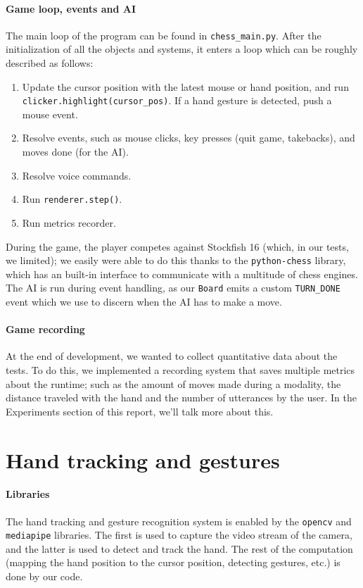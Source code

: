 \documentclass[a4paper, 11pt, twocolumn]{IEEEtran}
\begin{document}
    \paragraph*{Game loop, events and AI} The main loop of the program can be found in \texttt{chess\_main.py}. After the initialization of all the objects and systems, it enters a loop which can be roughly described as follows:
    \begin{enumerate}
        \item Update the cursor position with the latest mouse or hand position, and run \texttt{clicker.highlight(cursor\_pos)}. If a hand gesture is detected, push a mouse event.
        \item Resolve events, such as mouse clicks, key presses (quit game, takebacks), and moves done (for the AI).
        \item Resolve voice commands.
        \item Run \texttt{renderer.step()}.
        \item Run metrics recorder.
    \end{enumerate}
    During the game, the player competes against Stockfish 16 (which, in our tests, we limited); we easily were able to do this thanks to the \texttt{python-chess} library, which has an built-in interface to communicate with a multitude of chess engines. The AI is run during event handling, as our \texttt{Board} emits a custom \texttt{TURN\_DONE} event which we use to discern when the AI has to make a move.
    \paragraph*{Game recording} At the end of development, we wanted to collect quantitative data about the tests. To do this, we implemented a recording system that saves multiple metrics about the runtime; such as the amount of moves made during a modality, the distance traveled with the hand and the number of utterances by the user. In the Experiments section of this report, we'll talk more about this.
    \section{Hand tracking and gestures}
    \paragraph*{Libraries} The hand tracking and gesture recognition system is enabled by the \texttt{opencv} and \texttt{mediapipe} libraries. The first is used to capture the video stream of the camera, and the latter is used to detect and track the hand. The rest of the computation (mapping the hand position to the cursor position, detecting gestures, etc.) is done by our code.
\end{document}

